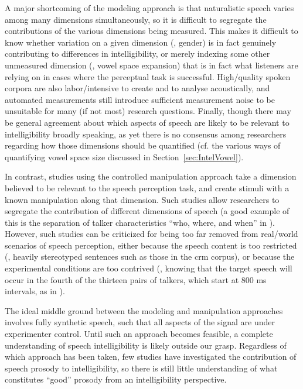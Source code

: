A major shortcoming of the modeling approach is that naturalistic speech varies among many dimensions simultaneously, so it is difficult to segregate the contributions of the various dimensions being measured.  This makes it difficult to know whether variation on a given dimension (\eg, gender) is in fact genuinely contributing to differences in intelligibility, or merely indexing some other unmeasured dimension (\eg, vowel space expansion) that is in fact what listeners are relying on in cases where the perceptual task is successful.  High\-/quality spoken corpora are also labor\-/intensive to create and to analyse acoustically, and automated measurements still introduce sufficient measurement noise to be unsuitable for many (if not most) research questions.  Finally, though there may be general agreement about which aspects of speech are likely to be relevant to intelligibility broadly speaking, as yet there is no consensus among researchers regarding how those dimensions should be quantified (cf. the various ways of quantifying vowel space size discussed in Section~\ref{sec:IntelVowel}).

In contrast, studies using the controlled manipulation approach take a dimension believed to be relevant to the speech perception task, and create stimuli with a known manipulation along that dimension.\footnotemark{}  Such studies allow researchers to segregate the contribution of different dimensions of speech (a good example of this is the separation of talker characteristics “who, where, and when” in \citealt{KitterickEtAl2010}).  However, such studies can be criticized for being too far removed from real\-/world scenarios of speech perception, either because the speech content is too restricted (\ie, heavily stereotyped sentences such as those in the \ac{crm} corpus), or because the experimental conditions are too contrived (\eg, knowing that the target speech will occur in the fourth of the thirteen pairs of talkers, which start at 800 ms intervals, as in \citealt{KitterickEtAl2010}).

The ideal middle ground between the modeling and manipulation approaches involves fully synthetic speech, such that all aspects of the signal are under experimenter control.  Until such an approach becomes feasible, a complete understanding of speech intelligibility is likely outside our grasp.  Regardless of which approach has been taken, few studies have investigated the contribution of speech prosody to intelligibility, so there is still little understanding of what constitutes “good” prosody from an intelligibility perspective.

